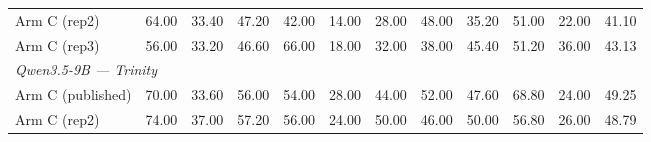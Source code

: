 \begin{table}[t]
{\begin{tabular}{lrrrrrrrrrrr}
Arm C (rep2) & 64.00 & 33.40 & 47.20 & 42.00 & 14.00 & 28.00 & 48.00 & 35.20 & 51.00 & 22.00 & 41.10 \\
Arm C (rep3) & 56.00 & 33.20 & 46.60 & 66.00 & 18.00 & 32.00 & 38.00 & 45.40 & 51.20 & 36.00 & 43.13 \\
\midrule
\multicolumn{12}{l}{\textit{Qwen3.5-9B --- Trinity}} \\
Arm C (published) & 70.00 & 33.60 & 56.00 & 54.00 & 28.00 & 44.00 & 52.00 & 47.60 & 68.80 & 24.00 & 49.25 \\
Arm C (rep2) & 74.00 & 37.00 & 57.20 & 56.00 & 24.00 & 50.00 & 46.00 & 50.00 & 56.80 & 26.00 & 48.79 \\
\bottomrule
\end{tabular}%
}
\end{table}
